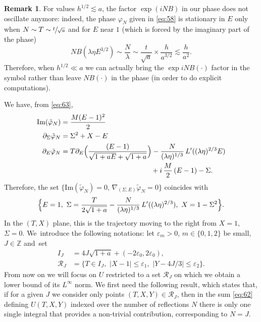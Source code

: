 \documentclass[JEP,XML,SOM,Unicode,NoEqCountersInSection,NoFloatCountersInSection,published]{cedram}
\let\mathcal\mathscr
\newcommand\Z{{\mathbb Z}}
\theoremstyle{plain}
\theoremstyle{definition}
\newtheorem{rmq}{Remark}[section]
\newcommand{\DomainXYT}{\mathcal{R}}
\begin{document}
\begin{rmq}\label{rmqBNB}
For values $h^{1/2}\lesssim a$, the factor $\exp{(iNB)}$ in our phase does not oscillate anymore: indeed, the phase $\varphi_N$ given in \eqref{eq:58} is stationary in $E$ only when $N\sim T\sim \sfrac{t}{\sqrt{a}}$ and for $E$ near $1$ (which is forced by the imaginary part of the phase)
\[
NB(\lambda\eta E^{3/2})\sim \frac{N}{\lambda}\sim \frac{t}{\sqrt{a}}\times \frac{h}{a^{3/2}}\lesssim \frac{h}{a^2}.
\]
Therefore, when $h^{1/2} \ll a$ we can actually bring the $\exp{iNB(\cdot)}$ factor in the symbol rather than leave $NB(\cdot)$ in the phase (in order to do explicit computations).
\end{rmq}
We have, from \eqref{eq:63},
\begin{align*}
\mathrm{Im} (\tilde \varphi_{N})&= \frac{M(E-1)^{2}}{2}\\
\partial_{\Sigma} \tilde \varphi_{N}&=\Sigma^{2}+X-E\\
\partial_{E} \tilde \varphi_{N}&= T\partial_{E}\Bigl(\frac{(E-1)}{ \sqrt{1+aE}+\sqrt{1+a}}\Bigr) - \frac N {(\lambda \eta)^{1/3}}\, L'((\lambda \eta)^{2/3} E)\\
&\hspace*{4.5cm}{}+i\,\frac M 2 \,(E-1)-\Sigma.\notag
\end{align*}
Therefore, the set $\{\mathrm{Im}(\tilde \varphi_{N})=0,\, \nabla_{(\Sigma,E)}\tilde \varphi_{N}=0\}$ coincides with\begin{equation*}
\label{eq:59}
\Bigl\{ E=1,\,\, \Sigma=\frac{T}{2\sqrt {1+a}} - \frac N {(\lambda \eta)^{1/3}}\, L'((\lambda \eta)^{2/3}),\,\,X=1-\Sigma^{2}\Bigr\}.
\end{equation*}
In the $(T,X)$ plane, this is the trajectory moving to the right from $X=1$, $\Sigma=0$. We~introduce the following notations: let $\varepsilon_m\!>\!0$, $m\!\in\!\{0,1,2\}$ be small, $J\!\in\!\Z$ and~set
\begin{align*}
I_{J}&=4J \sqrt{1+a}+(-2\varepsilon_{0},2\varepsilon_{0}),
\\
\DomainXYT_{J}&=\{T\in I_{J},\,\, |X-1|\leq \varepsilon_{1},\,\, |Y-4 J/3|\leq \varepsilon_{2}\}.
\end{align*}
From now on we will focus on $U$ restricted to a set $\DomainXYT_J$ on which we obtain a lower bound of its $L^{\infty}$ norm. We first need the following result, which states that, if for a given $J$ we consider only points $(T,X,Y)\in \DomainXYT_J$, then in the sum \eqref{eq:62} defining $U(T,X,Y)$ indexed over the number of reflections $N$ there is only one single integral that provides a non-trivial contribution, corresponding to $N=J$.
\end{document}
